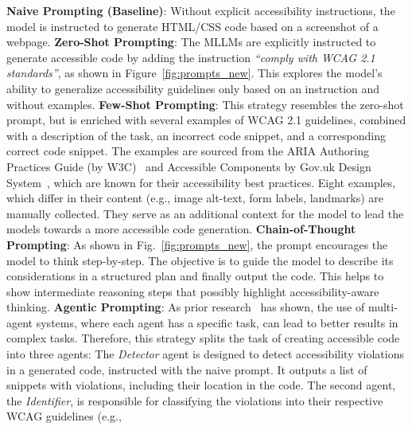 \textbf{Naive Prompting (Baseline)}: 
  Without explicit accessibility instructions, the model is
  instructed to generate HTML/CSS code based on a screenshot of a webpage.\newline\newline
\textbf{Zero-Shot Prompting}: 
  The MLLMs are explicitly instructed to 
  generate accessible code by adding the instruction \textit{``comply with WCAG 2.1 standards''}, 
  as shown in Figure~\ref{fig:prompts_new}. 
  This explores the model's ability to generalize accessibility guidelines 
  only based on an instruction and without examples.\newline\newline
\textbf{Few-Shot Prompting}: 
  This strategy resembles the zero-shot prompt,
  but is enriched with several examples of WCAG 2.1 guidelines, combined 
  with a description of the task, an incorrect code snippet, and a 
  corresponding correct code snippet.
  The examples are sourced from the ARIA Authoring Practices Guide 
  (by W3C)~\cite{web:w3c_examples} and Accessible Components by Gov.uk 
  Design System~\cite{web:govuk}, which are known for their accessibility
  best practices.
  Eight examples, which differ in their content (e.g., image alt-text, 
  form labels, landmarks) are manually collected. They serve as an 
  additional context for the model to lead the models towards a more 
  accessible code generation.\newline\newline
\textbf{Chain-of-Thought Prompting}: 
  As shown in Fig.~\ref{fig:prompts_new}, 
  the prompt encourages the model to think step-by-step. 
  The objective is to guide the model to describe its 
  considerations in a structured plan and finally output the code.
  This helps to show intermediate reasoning steps that possibly 
  highlight accessibility-aware thinking.\newline\newline
\textbf{Agentic Prompting}: 
  As prior research~\cite{wu2023autogen} has shown, the use of multi-agent 
  systems, where each agent has a specific task, can lead to better
  results in complex tasks. Therefore, this strategy splits the 
  task of creating accessible code into three agents: The 
  \textit{Detector} agent is designed to detect accessibility violations 
  in a generated code, instructed with the naive prompt. It outputs a list
  of snippets with violations, including their location in the code. The 
  second agent, the \textit{Identifier}, is responsible for classifying 
  the violations into their respective WCAG guidelines (e.g., 
